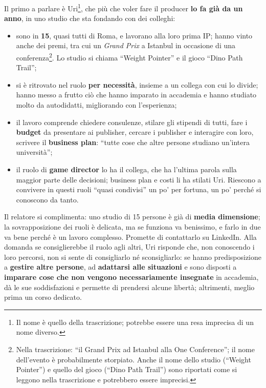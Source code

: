 Il primo a parlare è Uri\footnote{Il nome è quello della trascrizione; potrebbe
essere una resa imprecisa di un nome diverso.}, che più che voler fare il
producer \textbf{lo fa già da un anno}, in uno studio che sta fondando con dei
colleghi:
\begin{itemize}
  \item sono in \textbf{15}, quasi tutti di Roma, e lavorano alla loro prima IP;
        hanno vinto anche dei premi, tra cui un \emph{Grand Prix} a Istanbul in
        occasione di una conferenza\footnote{Nella trascrizione: ``il Grand Prix
        ad Istanbul alla One Conference''; il nome dell'evento è probabilmente
        storpiato. Anche il nome dello studio (``Weight Pointer'') e quello del
        gioco (``Dino Path Trail'') sono riportati come si leggono nella
        trascrizione e potrebbero essere imprecisi.}. Lo studio si chiama
        ``Weight Pointer'' e il gioco ``Dino Path Trail'';
  \item si è ritrovato nel ruolo \textbf{per necessità}, insieme a un collega
        con cui lo divide; hanno messo a frutto ciò che hanno imparato in
        accademia e hanno studiato molto da autodidatti, migliorando con
        l'esperienza;
  \item il lavoro comprende chiedere consulenze, stilare gli stipendi di tutti,
        fare i \textbf{budget} da presentare ai publisher, cercare i publisher e
        interagire con loro, scrivere il \textbf{business plan}: ``tutte cose
        che altre persone studiano un'intera università'';
  \item il ruolo di \textbf{game director} lo ha il collega, che ha l'ultima
        parola sulla maggior parte delle decisioni; business plan e costi li ha
        stilati Uri. Riescono a convivere in questi ruoli ``quasi condivisi'' un
        po' per fortuna, un po' perché si conoscono da tanto.
\end{itemize}
Il relatore si complimenta: uno studio di 15 persone è già di \textbf{media
dimensione}; la sovrapposizione dei ruoli è delicata, ma se funziona va
benissimo, e farlo in due va bene perché è un lavoro complesso. Promette di
contattarlo su LinkedIn. Alla domanda se consiglierebbe il ruolo agli altri,
Uri risponde che, non conoscendo i loro percorsi, non si sente di consigliarlo
né sconsigliarlo: se hanno predisposizione a \textbf{gestire altre persone}, ad
\textbf{adattarsi alle situazioni} e sono disposti a \textbf{imparare cose che
non vengono necessariamente insegnate} in accademia, dà le sue soddisfazioni e
permette di prendersi alcune libertà; altrimenti, meglio prima un corso dedicato.


